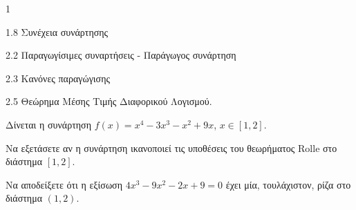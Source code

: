 \begin{ylh}{1}
    \item 1.8 Συνέχεια συνάρτησης
    \item 2.2 Παραγωγίσιμες συναρτήσεις - Παράγωγος συνάρτηση
    \item 2.3 Κανόνες παραγώγισης
    \item 2.5 Θεώρημα Μέσης Τιμής Διαφορικού Λογισμού.
\end{ylh}
Δίνεται η συνάρτηση $f(x) = x^4 - 3x^3 - x^2 + 9x$, $x \in [1,2]$.
\begin{alist}
\item Να εξετάσετε αν η συνάρτηση ικανοποιεί τις υποθέσεις του θεωρήματος Rolle στο διάστημα $[1,2]$. 
\item Να αποδείξετε ότι η εξίσωση $4x^3 - 9x^2 - 2x + 9 = 0$ έχει μία, τουλάχιστον, ρίζα στο διάστημα $(1,2)$. 
\end{alist}